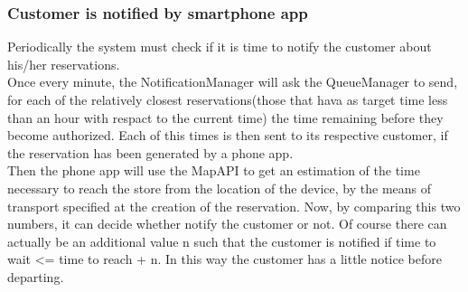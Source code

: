 \subsubsection{Customer is notified by smartphone app}
\begin{figure}[H]
	\noindent
\end{figure}
Periodically the system must check if it is time to notify the customer about his/her reservations.\\
Once every minute, the NotificationManager will ask the QueueManager to send, for each of the relatively closest reservations(those that hava as target time less than an hour with respact to the current time) the time remaining before they become authorized. Each of this times is then sent to its respective customer, if the reservation has been generated by a phone app.\\
Then the phone app will use the MapAPI to get an estimation of the time necessary to reach the store from the location of the device, by the means of transport specified at the creation of the reservation. Now, by comparing this two numbers, it can decide whether notify the customer or not. Of course there can actually be an additional value n such that the customer is notified if time to wait <= time to reach + n. In this way the customer has a little notice before departing.
\newpage
